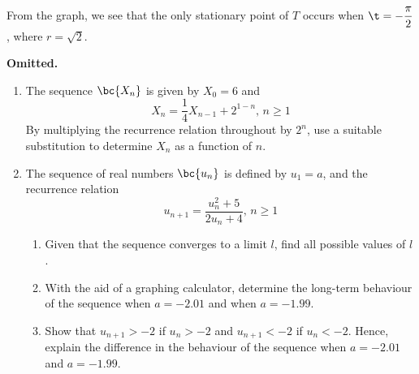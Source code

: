 \documentclass{echw}
\begin{document}
{\begin{center}
            \end{center}

             From the graph, we see that the only stationary point of $T$ occurs when $\t = -\dfrac\pi2$, where $r = \sqrt2$.

    \problem{}
        \textbf{Omitted.}

    \problem{}
        \begin{enumerate}
            \item The sequence $\bc{X_n}$ is given by $X_0 = 6$ and
            \[
                X_n = \dfrac14 X_{n-1} + 2^{1-n}, \, n \geq 1
            \]
            By multiplying the recurrence relation throughout by $2^n$, use a suitable substitution to determine $X_n$ as a function of $n$.
            \item The sequence of real numbers $\bc{u_n}$ is defined by $u_1 = a$, and the recurrence relation
            \[
                u_{n+1} = \dfrac{u_n^2 + 5}{2u_n + 4}, \, n \geq 1
            \]
            \begin{enumerate}
                \item Given that the sequence converges to a limit $l$, find all possible values of $l$.
                \item With the aid of a graphing calculator, determine the long-term behaviour of the sequence when $a = -2.01$ and when $a = -1.99$.
                \item Show that $u_{n+1} > -2$ if $u_n > -2$ and $u_{n+1} < -2$ if $u_n < -2$. Hence, explain the difference in the behaviour of the sequence when $a = -2.01$ and $a = -1.99$.
            \end{enumerate}
        \end{enumerate}

}
\end{document}
